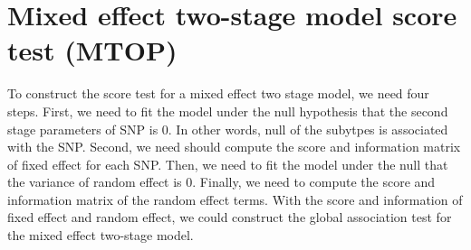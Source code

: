 \documentclass[11pt,]{article}
\begin{document}
\hypertarget{mixed-effect-two-stage-model-score-test-mtop}{%
\section{Mixed effect two-stage model score test
(MTOP)}\label{mixed-effect-two-stage-model-score-test-mtop}}

To construct the score test for a mixed effect two stage model, we need
four steps. First, we need to fit the model under the null hypothesis
that the second stage parameters of SNP is 0. In other words, null of
the subytpes is associated with the SNP. Second, we need should compute
the score and information matrix of fixed effect for each SNP. Then, we
need to fit the model under the null that the variance of random effect
is 0. Finally, we need to compute the score and information matrix of
the random effect terms. With the score and information of fixed effect
and random effect, we could construct the global association test for
the mixed effect two-stage model.
\end{document}
